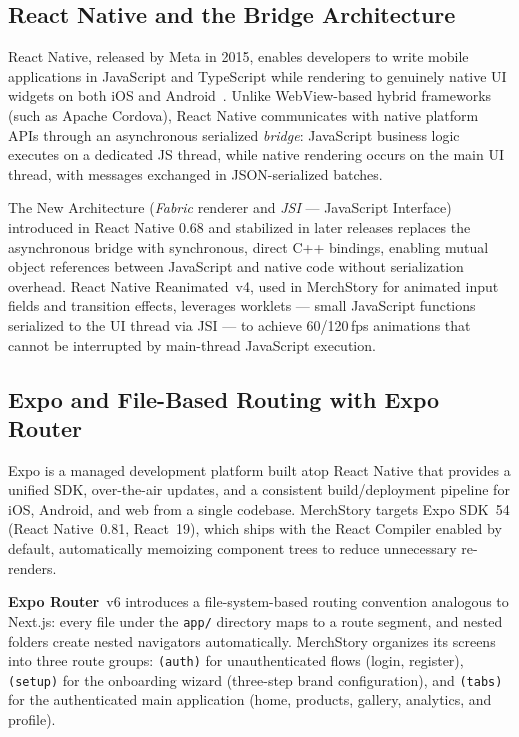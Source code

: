\documentclass[12pt, a4paper]{report}
\begin{document}
\subsection{React Native and the Bridge Architecture}

React Native, released by Meta in 2015, enables developers to write mobile
applications in JavaScript and TypeScript while rendering to genuinely native
UI widgets on both iOS and Android~\cite{eisenman2015learning}.  Unlike
WebView-based hybrid frameworks (such as Apache Cordova), React Native
communicates with native platform APIs through an asynchronous serialized
\emph{bridge}: JavaScript business logic executes on a dedicated JS thread,
while native rendering occurs on the main UI thread, with messages exchanged
in JSON-serialized batches.

\medskip\noindent
The New Architecture (\emph{Fabric} renderer and \emph{JSI} --- JavaScript
Interface) introduced in React Native 0.68 and stabilized in later releases
replaces the asynchronous bridge with synchronous, direct C++ bindings,
enabling mutual object references between JavaScript and native code without
serialization overhead.  React Native Reanimated~v4, used in MerchStory for
animated input fields and transition effects, leverages worklets --- small
JavaScript functions serialized to the UI thread via JSI --- to achieve
60/120\,fps animations that cannot be interrupted by main-thread JavaScript
execution.

\subsection{Expo and File-Based Routing with Expo Router}

Expo is a managed development platform built atop React Native that provides
a unified SDK, over-the-air updates, and a consistent build/deployment
pipeline for iOS, Android, and web from a single codebase.  MerchStory targets
Expo SDK~54 (React Native~0.81, React~19), which ships with the React
Compiler enabled by default, automatically memoizing component trees to reduce
unnecessary re-renders.

\medskip\noindent
\textbf{Expo Router}~v6 introduces a file-system-based routing convention
analogous to Next.js: every file under the \texttt{app/} directory maps to a
route segment, and nested folders create nested navigators automatically.
MerchStory organizes its screens into three route groups:
\texttt{(auth)} for unauthenticated flows (login, register),
\texttt{(setup)} for the onboarding wizard (three-step brand configuration),
and \texttt{(tabs)} for the authenticated main application (home, products,
gallery, analytics, and profile).
\end{document}
